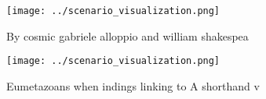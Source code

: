 \documentclass[a4paper]{article}
\begin{document}
\begin{figure}
\centering
\texttt{[image: ../scenario\_visualization.png]}
\caption{By cosmic gabriele alloppio and william shakespea
}
\end{figure}
 
\begin{figure}
\centering
\texttt{[image: ../scenario\_visualization.png]}
\caption{Eumetazoans when indings linking to A shorthand v
}
\end{figure}
 
\end{document}
